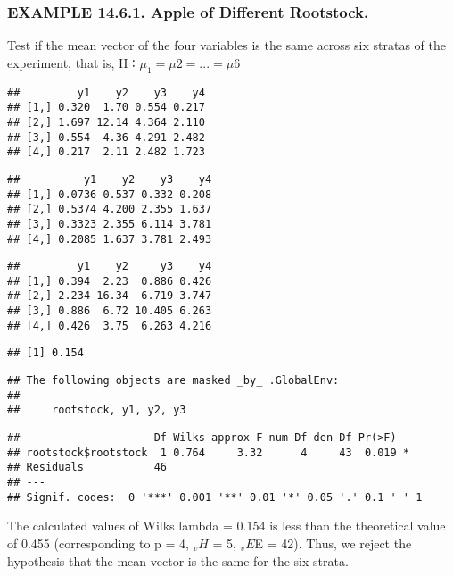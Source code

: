 \documentclass[]{article}
\begin{document}
\hypertarget{example-14.6.1.-apple-of-different-rootstock.}{%
\subsubsection{EXAMPLE 14.6.1. Apple of Different
Rootstock.}\label{example-14.6.1.-apple-of-different-rootstock.}}

Test if the mean vector of the four variables is the same across six
stratas of the experiment, that is, H ∶ \(\mu_1 = \mu2 = ... = \mu6\)

\begin{verbatim}
##         y1    y2    y3    y4
## [1,] 0.320  1.70 0.554 0.217
## [2,] 1.697 12.14 4.364 2.110
## [3,] 0.554  4.36 4.291 2.482
## [4,] 0.217  2.11 2.482 1.723
\end{verbatim}

\begin{verbatim}
##          y1    y2    y3    y4
## [1,] 0.0736 0.537 0.332 0.208
## [2,] 0.5374 4.200 2.355 1.637
## [3,] 0.3323 2.355 6.114 3.781
## [4,] 0.2085 1.637 3.781 2.493
\end{verbatim}

\begin{verbatim}
##         y1    y2     y3    y4
## [1,] 0.394  2.23  0.886 0.426
## [2,] 2.234 16.34  6.719 3.747
## [3,] 0.886  6.72 10.405 6.263
## [4,] 0.426  3.75  6.263 4.216
\end{verbatim}

\begin{verbatim}
## [1] 0.154
\end{verbatim}

\begin{verbatim}
## The following objects are masked _by_ .GlobalEnv:
## 
##     rootstock, y1, y2, y3
\end{verbatim}

\begin{verbatim}
##                     Df Wilks approx F num Df den Df Pr(>F)  
## rootstock$rootstock  1 0.764     3.32      4     43  0.019 *
## Residuals           46                                      
## ---
## Signif. codes:  0 '***' 0.001 '**' 0.01 '*' 0.05 '.' 0.1 ' ' 1
\end{verbatim}

The calculated values of Wilks lambda = 0.154 is less than the
theoretical value of 0.455 (corresponding to p = 4, \(_vH\) = 5,
\(_vE\)E = 42). Thus, we reject the hypothesis that the mean vector is
the same for the six strata.
\end{document}
